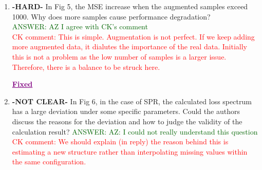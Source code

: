 \documentclass{article}
\newcommand{\fixed}{\Large \textcolor{purple}{ \underline{\textbf{Fixed}} }}
\begin{document}
\begin{enumerate}
\item \textbf{-HARD-} In Fig 5, the MSE increase when the augmented samples exceed 1000. Why does more samples cause performance degradation? \\ 
\textcolor{darkgreen}{ANSWER: AZ I agree with CK's comment}\\ \textcolor{red}{CK comment: This is simple. Augmentation is not perfect. If we keep adding more augmented data, it dialutes the importance of the real data. Initially this is not a problem as the low number of samples is a larger issue. Therefore, there is a balance to be struck here.} 

\fixed


\item \textbf{-NOT CLEAR-} In Fig 6, in the case of SPR, the calculated loss spectrum has a large deviation under some specific parameters. Could the authors discuss the reasons for the deviation and how to judge the validity of the calculation result?
\textcolor{darkgreen}{ANSWER: AZ: I could not really understand this question} \\
\textcolor{red}{CK comment: We should explain (in reply) the reason behind this is estimating a new structure rather than interpolating missing values within the same configuration.}

\end{enumerate}
\end{document}
